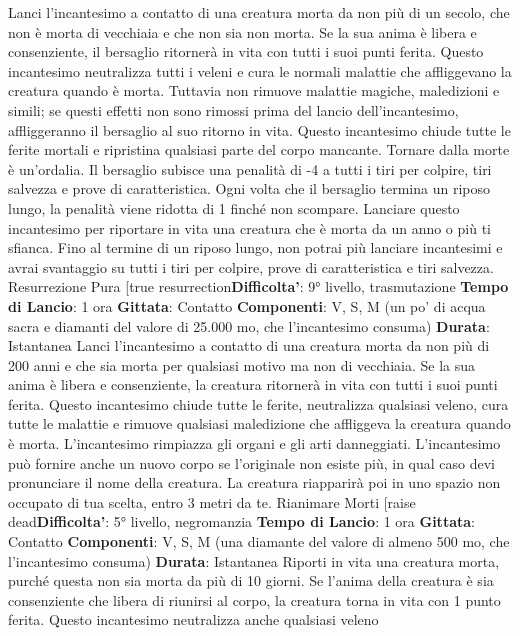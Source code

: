 \begin{multicols}{2}
Lanci l’incantesimo a contatto di una creatura morta da
non più di un secolo, che non è morta di vecchiaia e
che non sia non morta. Se la sua anima è libera e
consenziente, il bersaglio ritornerà in vita con tutti i suoi
punti ferita.
Questo incantesimo neutralizza tutti i veleni e cura le
normali malattie che affliggevano la creatura quando è
morta. Tuttavia non rimuove malattie magiche,
maledizioni e simili; se questi effetti non sono rimossi
prima del lancio dell’incantesimo, affliggeranno il
bersaglio al suo ritorno in vita.
Questo incantesimo chiude tutte le ferite mortali e
ripristina qualsiasi parte del corpo mancante.
Tornare dalla morte è un’ordalia. Il bersaglio subisce
una penalità di -4 a tutti i tiri per colpire, tiri salvezza e
prove di caratteristica. Ogni volta che il bersaglio
termina un riposo lungo, la penalità viene ridotta di 1
finché non scompare.
Lanciare questo incantesimo per riportare in vita una
creatura che è morta da un anno o più ti sfianca. Fino al
termine di un riposo lungo, non potrai più lanciare
incantesimi e avrai svantaggio su tutti i tiri per colpire,
prove di caratteristica e tiri salvezza.
Resurrezione Pura
[true resurrection\textbf{Difficolta'}:
9° livello, trasmutazione
\textbf{Tempo di Lancio}: 1 ora
\textbf{Gittata}: Contatto
\textbf{Componenti}: V, S, M (un po’ di acqua sacra e diamanti
del valore di 25.000 mo, che l’incantesimo consuma)
\textbf{Durata}: Istantanea
Lanci l’incantesimo a contatto di una creatura morta da
non più di 200 anni e che sia morta per qualsiasi motivo
ma non di vecchiaia. Se la sua anima è libera e
consenziente, la creatura ritornerà in vita con tutti i suoi
punti ferita.
Questo incantesimo chiude tutte le ferite, neutralizza
qualsiasi veleno, cura tutte le malattie e rimuove
qualsiasi maledizione che affliggeva la creatura quando
è morta. L’incantesimo rimpiazza gli organi e gli arti
danneggiati.
L’incantesimo può fornire anche un nuovo corpo se
l’originale non esiste più, in qual caso devi pronunciare
il nome della creatura. La creatura riapparirà poi in uno
spazio non occupato di tua scelta, entro 3 metri da te.
Rianimare Morti
[raise dead\textbf{Difficolta'}:
5° livello, negromanzia
\textbf{Tempo di Lancio}: 1 ora
\textbf{Gittata}: Contatto
\textbf{Componenti}: V, S, M (una diamante del valore di
almeno 500 mo, che l’incantesimo consuma)
\textbf{Durata}: Istantanea
Riporti in vita una creatura morta, purché questa non
sia morta da più di 10 giorni. Se l’anima della creatura è
sia consenziente che libera di riunirsi al corpo, la
creatura torna in vita con 1 punto ferita.
Questo incantesimo neutralizza anche qualsiasi veleno

\end{multicols}
